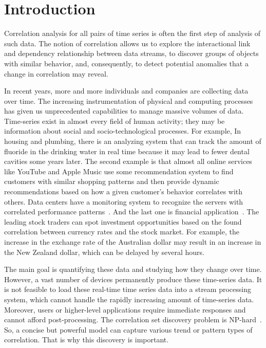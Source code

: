 \section{Introduction}
Correlation analysis for all pairs of time series is often the first step of analysis of such data. The notion of correlation allows us to explore the interactional link and dependency relationship between data streams, to discover groups of objects with similar behavior, and, consequently, to detect potential anomalies that a change in correlation may reveal.\newline

In recent years, more and more individuals and companies are collecting data over time. The increasing instrumentation of physical and computing processes has given us unprecedented capabilities to manage massive volumes of data. Time-series exist in almost every field of human activity; they may be information about social and socio-technological processes. For example, In housing and plumbing, there is an analyzing system that can track the amount of fluoride in the drinking water in real time because it may lead to fewer dental cavities some years later. The second example is that almost all online services like YouTube and Apple Music use some recommendation system to find customers with similar shopping patterns and then provide dynamic recommendations based on how a given customer's behavior correlates with others. Data centers have a monitoring system to recognize the servers with correlated performance patterns~\cite{ref16}. And the last one is financial application~\cite{ref15}. The leading stock traders can spot investment opportunities based on the found correlation between currency rates and the stock market. For example, the increase in the exchange rate of the Australian dollar may result in an increase in the New Zealand dollar, which can be delayed by several hours. \newline

The main goal is quantifying these data and studying how they change over time. However, a vast number of devices permanently produce these time-series data. It is not feasible to load these real-time time series data into a stream processing system, which cannot handle the rapidly increasing amount of time-series data. Moreover, users or higher-level applications require immediate responses and cannot afford post-processing. The correlation set discovery problem is NP-hard~\cite{ref11}. So, a concise but powerful model can capture various trend or pattern types of correlation. That is why this discovery is important. \newline

